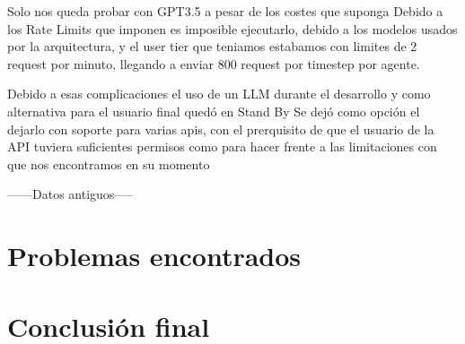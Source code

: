 	Solo nos queda probar con GPT3.5 a pesar de los costes que suponga
		Debido a los Rate Limits que imponen es imposible ejecutarlo, debido a los modelos usados por la arquitectura, y el user tier que teniamos estabamos con limites de 2 request por minuto, llegando a enviar 800 request por timestep por agente.
	
	Debido a esas complicaciones el uso de un LLM durante el desarrollo y como alternativa para el usuario final quedó en Stand By
		Se dejó como opción el dejarlo con soporte para varias apis, con el prerquisito de que el usuario de la API tuviera suficientes permisos como para hacer frente a las limitaciones con que nos encontramos en su momento

------Datos antiguos-----

\section{Problemas encontrados}

\section{Conclusión final}
